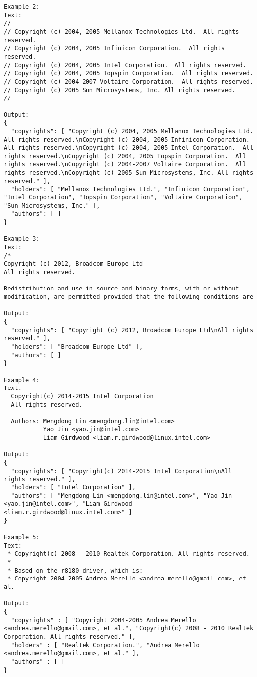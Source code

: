 \begin{lstlisting}[keepspaces=true]
Example 2:
Text:
//
// Copyright (c) 2004, 2005 Mellanox Technologies Ltd.  All rights reserved.
// Copyright (c) 2004, 2005 Infinicon Corporation.  All rights reserved.
// Copyright (c) 2004, 2005 Intel Corporation.  All rights reserved.
// Copyright (c) 2004, 2005 Topspin Corporation.  All rights reserved.
// Copyright (c) 2004-2007 Voltaire Corporation.  All rights reserved.
// Copyright (c) 2005 Sun Microsystems, Inc. All rights reserved.
//

Output:
{
  "copyrights": [ "Copyright (c) 2004, 2005 Mellanox Technologies Ltd.  All rights reserved.\nCopyright (c) 2004, 2005 Infinicon Corporation.  All rights reserved.\nCopyright (c) 2004, 2005 Intel Corporation.  All rights reserved.\nCopyright (c) 2004, 2005 Topspin Corporation.  All rights reserved.\nCopyright (c) 2004-2007 Voltaire Corporation.  All rights reserved.\nCopyright (c) 2005 Sun Microsystems, Inc. All rights reserved." ],
  "holders": [ "Mellanox Technologies Ltd.", "Infinicon Corporation", "Intel Corporation", "Topspin Corporation", "Voltaire Corporation", "Sun Microsystems, Inc." ],
  "authors": [ ]
}

Example 3:
Text:
/*
Copyright (c) 2012, Broadcom Europe Ltd
All rights reserved.

Redistribution and use in source and binary forms, with or without
modification, are permitted provided that the following conditions are

Output:
{
  "copyrights": [ "Copyright (c) 2012, Broadcom Europe Ltd\nAll rights reserved." ],
  "holders": [ "Broadcom Europe Ltd" ],
  "authors": [ ]
}

Example 4:
Text:
  Copyright(c) 2014-2015 Intel Corporation
  All rights reserved.

  Authors: Mengdong Lin <mengdong.lin@intel.com>
           Yao Jin <yao.jin@intel.com>
           Liam Girdwood <liam.r.girdwood@linux.intel.com>

Output:
{
  "copyrights": [ "Copyright(c) 2014-2015 Intel Corporation\nAll rights reserved." ],
  "holders": [ "Intel Corporation" ],
  "authors": [ "Mengdong Lin <mengdong.lin@intel.com>", "Yao Jin <yao.jin@intel.com>", "Liam Girdwood <liam.r.girdwood@linux.intel.com>" ]
}

Example 5:
Text:
 * Copyright(c) 2008 - 2010 Realtek Corporation. All rights reserved.
 *
 * Based on the r8180 driver, which is:
 * Copyright 2004-2005 Andrea Merello <andrea.merello@gmail.com>, et al.

Output:
{
  "copyrights" : [ "Copyright 2004-2005 Andrea Merello <andrea.merello@gmail.com>, et al.", "Copyright(c) 2008 - 2010 Realtek Corporation. All rights reserved." ],
  "holders" : [ "Realtek Corporation.", "Andrea Merello <andrea.merello@gmail.com>, et al." ],
  "authors" : [ ]
}


\end{lstlisting}
